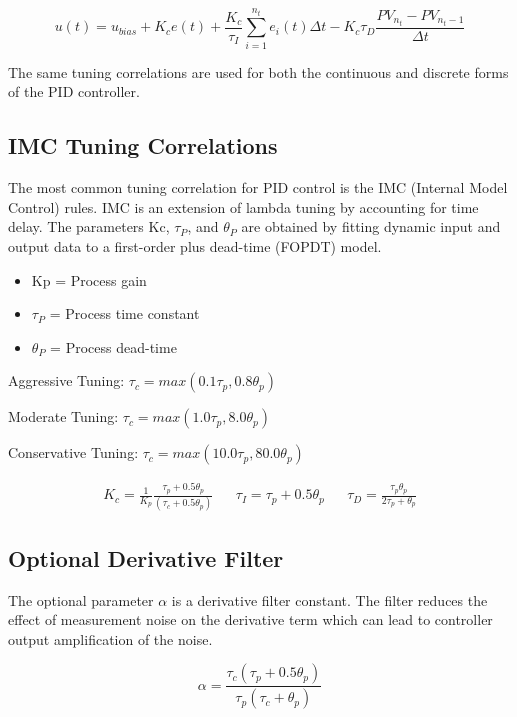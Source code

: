 \[    u(t) = u_{bias} + K_c e(t) + \frac{K_c}{\tau_I} \sum_{i=1}^{n_t} e_i(t) \Delta t - K_c \tau_D \frac{PV_{n_t} - PV_{n_t-1}}{\Delta t} \]

The same tuning correlations are used for both the continuous and discrete forms of the PID controller.

\subsection{IMC Tuning Correlations}

The most common tuning correlation for PID control is the IMC (Internal Model Control) rules. IMC is an extension of lambda tuning by accounting for time delay. The parameters Kc, $\tau_{P}$, and $\theta_{P}$ are obtained by fitting dynamic input and output data to a first-order plus dead-time (FOPDT) model. 
\begin{itemize}
    \item Kp = Process gain 
    \item $\tau_{P}$ = Process time constant
    \item $\theta_{P}$ = Process dead-time
\end{itemize}

\begin{center}
    
Aggressive Tuning: $\tau_c = max(0.1\tau_p, 0.8\theta_p)$

Moderate Tuning: $\tau_c = max(1.0\tau_p, 8.0\theta_p)$

Conservative Tuning: $\tau_c = max(10.0\tau_p, 80.0\theta_p)$

\begin{align*}
     K_c = \frac{1}{K_p} \frac{\tau_p + 0.5\theta_p}{(\tau_c + 0.5\theta_p)}   && \tau_I = \tau_p + 0.5\theta_p   && \tau_D = \frac{\tau_p \theta_p}{2 \tau_p + \theta_p}
\end{align*}

\end{center}

\subsection{Optional Derivative Filter}
The optional parameter $\alpha$  is a derivative filter constant. The filter reduces the effect of measurement noise on the derivative term which can lead to controller output amplification of the noise.

\[ \alpha = \frac{\tau_c (\tau_p + 0.5\theta_p)}{\tau_p (\tau_c + \theta_p)}\]

